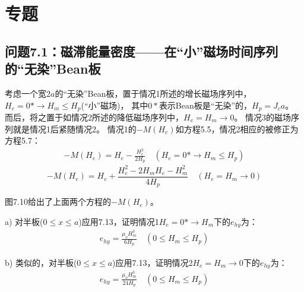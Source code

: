 \section{专题}
\subsection{问题7.1：磁滞能量密度——在“小”磁场时间序列的“无染”Bean板}
考虑一个宽$2a$的“无染”Bean板，置于情况1所述的增长磁场序列中，$H_e=0*\rightarrow H_m\le H_p$(“小”磁场)，
其中$0*$表示Bean板是“无染”的，$H_p=J_c a$。
而后，将之置于如情况2所述的降低磁场序列中，$H_e=H_m\rightarrow 0$。
情况3的磁场序列就是情况1后紧随情况2。
情况1的$-M(H_e)$如方程5.5，情况2相应的被修正为方程5.7：
\begin{align*}%
-M(H_e)=H_e-\frac{H_{e}^{2}}{2H_p} \quad (H_e=0*\rightarrow H_m\leq H_p) \tag{5.5}
\end{align*}
\begin{equation}%
-M(H_e)=H_e+\frac{H_{e}^{2}-2H_mH_e-H_{m}^{2}}{4H_p}   \quad   (H_e=H_m\rightarrow 0)
\end{equation}

图7.10给出了上面两个方程的$-M(H_e)$。

a) 对半板($0\le x\le a$)应用7.13，证明情况1$H_e=0*\rightarrow H_m$下的$e_{hy}$为：
\begin{align*}%
e_{hy}=\frac{\mu_oH_{m}^{3}}{6H_p}  \quad      (0\leq H_m\leq H_p) \tag{7.13b}
\end{align*}

b) 类似的，对半板($0\le x\le a$)应用7.13，证明情况2$H_e=H_m\rightarrow 0$下的$e_{hy}$为：
\begin{align}%
e_{hy}=\frac{\mu_oH_{m}^{3}}{24H_p}  \quad     (0\leq H_m\leq H_p)
\end{align}

